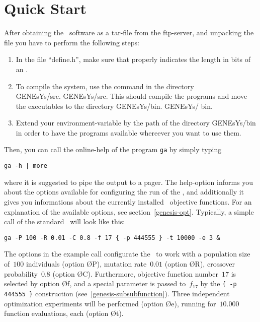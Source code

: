 %
%

\section{Quick Start}\label{genesis-ist}

After obtaining the \GEN\ software as a tar-file from the ftp-server,
and unpacking the file you have to perform the following steps:

\begin{enumerate}
%
\item	In the file ``define.h'', make sure that  properly
	indicates the length in  bits of an .
%
\item	To compile the system, use the  command in the
	directory 
	\ifUS
		\\ GENEsYs/src.
	\else
		GENEsYs/src.
	\fi
       	This should compile the  programs  and move the executables to the 
	directory 
	\ifUS
		GENEsYs/bin.
	\else
		GENEsYs/ bin.
	\fi
%
\item	Extend your environment-variable  by the path of the
	directory GENEsYs/bin in order to have the programs available
	whereever you want to use them.
%
\end{enumerate}

Then, you can call the online-help of the program \verb/ga/ by simply
typing 
%
\begin{center}
	\verb/ga -h | more/
\end{center}
%
where it is suggested to pipe the output to a pager.
The help-option informs you about the options available for configuring
the run of the \GA, and additionally it gives you informations about the
currently installed \NbrFct\ objective functions.
For an explanation of the available options, see section~\ref{genesis-opt}.
Typically, a simple call of the standard \GA\ will look like this:
%
\begin{center}
	\verb/ga -P 100 -R 0.01 -C 0.8 -f 17 { -p 444555 } -t 10000 -e 3 &/
\end{center}

The options in the example call configurate the \GA\ to work with a 
population size of~$100$ individuals (option \O{P}), mutation rate~$0.01$
(option \O{R}), crossover probability~$0.8$ (option \O{C}).
Furthermore, objective function number~$17$ is selected by option \O{f},
and a special parameter is passed to~$f_{17}$ by the \verb/{ -p 444555 }/
construction (see~\ref{genesis-subsubfunction}).
Three independent optimization experiments will be performed (option \O{e}),
running for~$10.000$ function evaluations, each (option \O{t}).


